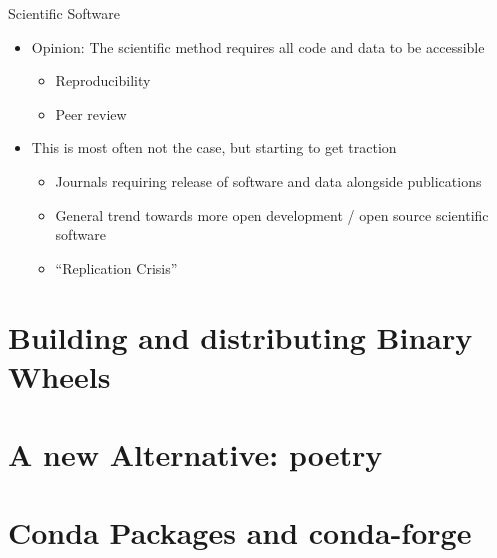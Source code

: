 \documentclass[
  aspectratio=1610,
]{beamer}
\begin{document}
\begin{frame}[c]{Scientific Software}
  \begin{itemize}
    \item Opinion: The scientific method requires all code and data to be accessible
      \begin{itemize}
        \item Reproducibility
        \item Peer review
      \end{itemize}
    \item This is most often not the case, but starting to get traction
      \begin{itemize}
        \item Journals requiring release of software and data alongside publications
        \item General trend towards more open development / open source scientific software
        \item \enquote{Replication Crisis}
      \end{itemize}
  \end{itemize}
\end{frame}

\section{Building and distributing Binary Wheels}
\section{A new Alternative: poetry}
\section{Conda Packages and conda-forge}
\end{document}
